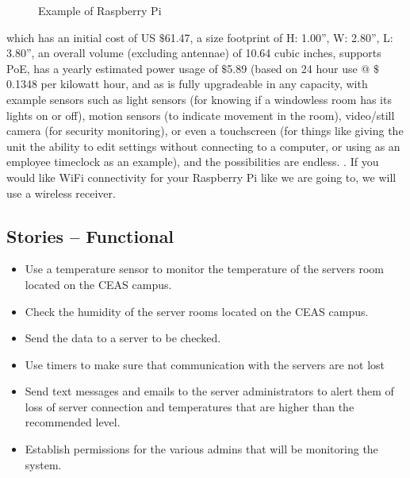 \documentclass{report}
\begin{document}
\begin{figure}[H]
\caption{Example of Raspberry Pi}
\end{figure}
which has an initial cost of US $\$$61.47, a size footprint of H: 1.00”, W: 2.80”, L: 3.80”, an overall volume (excluding antennae) of 10.64 cubic inches, supports PoE, has a yearly estimated power usage of $\$$5.89 (based on 24 hour use @ $\$$0.1348 per kilowatt hour, and as is fully upgradeable in any capacity, with example sensors such as light sensors (for knowing if a windowless room has its lights on or off), motion sensors (to indicate movement in the room), video/still camera (for security monitoring), or even a touchscreen (for things like giving the unit the ability to edit settings without connecting to a computer, or using as an employee timeclock as an example), and the possibilities are endless.
. If you would like WiFi connectivity for your Raspberry Pi like we are going to, we will use a wireless receiver.
\newpage
\subsection*{Stories -- Functional}
\begin {itemize}
\item Use a temperature sensor to monitor the temperature of the servers room located on the CEAS campus.
\item Check the humidity of the server rooms located on the CEAS campus.
\item Send the data to a server to be checked.
\item Use timers to make sure that communication with the servers are not lost
\item Send text messages and emails to the server administrators to alert them of loss of server connection and temperatures that are higher than the recommended level.
\item Establish permissions for the various admins that will be monitoring the system.
\end {itemize}
\newpage
\end{document}
